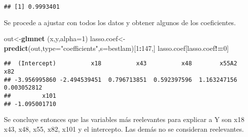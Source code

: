 \documentclass[
]{article}
\newenvironment{Shaded}{\begin{snugshade}}{\end{snugshade}}
\newcommand{\DataTypeTok}[1]{\textcolor[rgb]{0.13,0.29,0.53}{#1}}
\newcommand{\DecValTok}[1]{\textcolor[rgb]{0.00,0.00,0.81}{#1}}
\newcommand{\KeywordTok}[1]{\textcolor[rgb]{0.13,0.29,0.53}{\textbf{#1}}}
\newcommand{\NormalTok}[1]{#1}
\newcommand{\OperatorTok}[1]{\textcolor[rgb]{0.81,0.36,0.00}{\textbf{#1}}}
\newcommand{\StringTok}[1]{\textcolor[rgb]{0.31,0.60,0.02}{#1}}
\begin{document}
\begin{verbatim}
## [1] 0.9993401
\end{verbatim}

Se procede a ajustar con todos los datos y obtener algunos de los
coeficientes.

\begin{Shaded}
\begin{Highlighting}[]
\NormalTok{out<-}\KeywordTok{glmnet}\NormalTok{ (x,y,}\DataTypeTok{alpha=}\DecValTok{1}\NormalTok{) }
\NormalTok{lasso.coef<-}\KeywordTok{predict}\NormalTok{(out,}\DataTypeTok{type=}\StringTok{"coefficients"}\NormalTok{,}\DataTypeTok{s=}\NormalTok{bestlam)[}\DecValTok{1}\OperatorTok{:}\DecValTok{147}\NormalTok{,] }
\NormalTok{lasso.coef[lasso.coef}\OperatorTok{!=}\DecValTok{0}\NormalTok{]}
\end{Highlighting}
\end{Shaded}

\begin{verbatim}
##  (Intercept)          x18          x43          x48        x55A2          x82 
## -3.956995860 -2.494539451  0.796713851  0.592397596  1.163247156  0.003052812 
##         x101 
## -1.095001710
\end{verbatim}

Se concluye entonces que las variables más reelevantes para explicar a Y
son x18 x43, x48, x55, x82, x101 y el intercepto. Las demás no se
consideran reelevantes.
\end{document}
